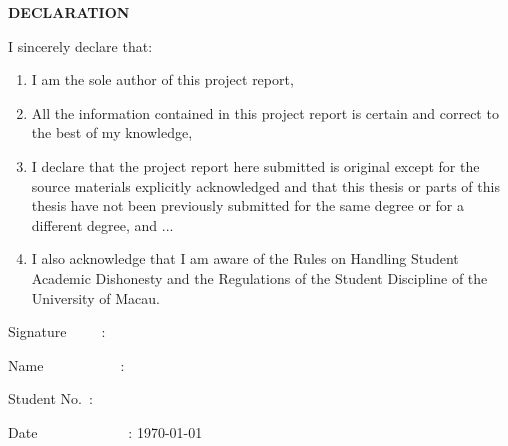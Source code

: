 \documentclass[12pt,,a4paper]{article}
\begin{document}
\onecolumn

\begin{center}
\textbf{\fontsize{20}{\baselineskip}\selectfont DECLARATION}

\bigskip

\end{center}
I sincerely declare that:
\begin{enumerate}
      \item I am the sole author of this project report,
      \item All the information contained in this project report is certain and correct to the best of my knowledge,
      \item I declare that the project report here submitted is original except for the source materials explicitly acknowledged and that this thesis or parts of this thesis have not been previously submitted for the same degree or for a different degree, and ...
      \item I also acknowledge that I am aware of the Rules on Handling Student Academic Dishonesty and the Regulations of the Student Discipline of the University of Macau.
\end{enumerate}

\bigskip

\bigskip

Signature\ \ \ \ \ :

\bigskip

\bigskip

Name\ \ \ \ \ \ \ \ \ \ \ :

\bigskip

\bigskip

Student No.\ :

\bigskip

\bigskip

Date\ \ \ \ \ \ \ \ \ \ \ \ \ : {\today}
\clearpage
\end{document}
